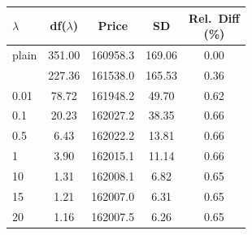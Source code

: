\begin{table}[h]
\begin{minipage}[t]{0.48\textwidth}
\begin{tabular}[t]{lcccc}
\toprule
$\lambda$ & df($\lambda$) & Price & SD & \shortstack{Rel.\ Diff\\(\%)}\\
\midrule
plain & 351.00 & 160958.3 & 169.06 & 0.00\\
\addlinespace
0.001 & 227.36 & 161538.0 & 165.53 & 0.36\\
0.01 & 78.72 & 161948.2 & 49.70 & 0.62\\
0.1 & 20.23 & 162027.2 & 38.35 & 0.66\\
0.5 & 6.43 & 162022.2 & 13.81 & 0.66\\
1 & 3.90 & 162015.1 & 11.14 & 0.66\\
10 & 1.31 & 162008.1 & 6.82 & 0.65\\
15 & 1.21 & 162007.0 & 6.31 & 0.65\\
20 & 1.16 & 162007.5 & 6.26 & 0.65\\
\bottomrule
\end{tabular}
\end{minipage}
\end{table}


